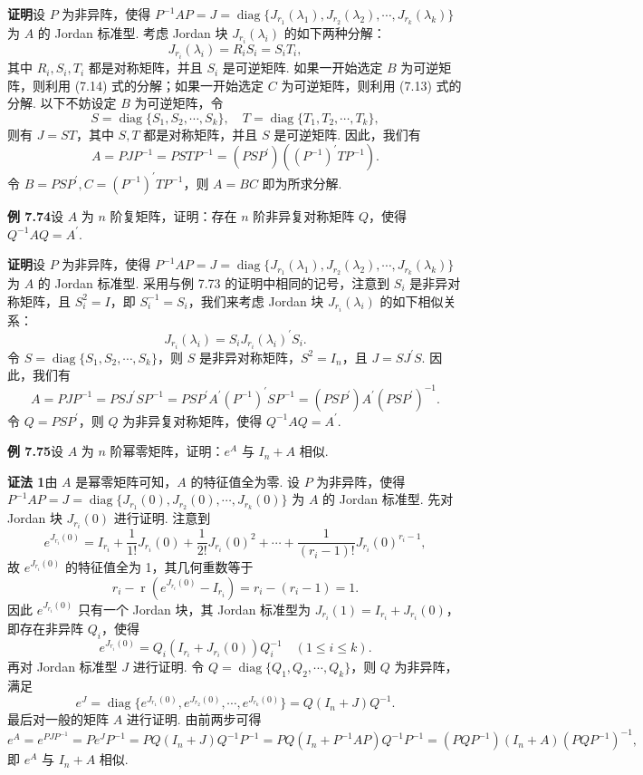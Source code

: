\documentclass[UTF8, 12pt, fontset=fandol, oneside]{ctexart}
\begin{document}
\noindent\textbf{证明}\quad 设 $P$ 为非异阵，使得 $P^{-1}AP=J=\operatorname{diag}\{J_{r_1}(\lambda_1),J_{r_2}(\lambda_2),\cdots,J_{r_k}(\lambda_k)\}$ 为 $A$ 的 Jordan 标准型. 考虑 Jordan 块 $J_{r_i}(\lambda_i)$ 的如下两种分解：
\[
J_{r_i}(\lambda_i)=R_iS_i=S_iT_i,
\tag{7.13--7.14}
\]
其中 $R_i,S_i,T_i$ 都是对称矩阵，并且 $S_i$ 是可逆矩阵. 如果一开始选定 $B$ 为可逆矩阵，则利用 (7.14) 式的分解；如果一开始选定 $C$ 为可逆矩阵，则利用 (7.13) 式的分解. 以下不妨设定 $B$ 为可逆矩阵，令
\[
S=\operatorname{diag}\{S_1,S_2,\cdots,S_k\},\quad T=\operatorname{diag}\{T_1,T_2,\cdots,T_k\},
\]
则有 $J=ST$，其中 $S,T$ 都是对称矩阵，并且 $S$ 是可逆矩阵. 因此，我们有
\[
A=PJP^{-1}=PSTP^{-1}=(PSP^{\prime})((P^{-1})^{\prime}TP^{-1}).
\]
令 $B=PSP^{\prime},C=(P^{-1})^{\prime}TP^{-1}$，则 $A=BC$ 即为所求分解.

\noindent\textbf{例 7.74}\quad 设 $A$ 为 $n$ 阶复矩阵，证明：存在 $n$ 阶非异复对称矩阵 $Q$，使得 $Q^{-1}AQ=A^{\prime}$.

\noindent\textbf{证明}\quad 设 $P$ 为非异阵，使得 $P^{-1}AP=J=\operatorname{diag}\{J_{r_1}(\lambda_1),J_{r_2}(\lambda_2),\cdots,J_{r_k}(\lambda_k)\}$ 为 $A$ 的 Jordan 标准型. 采用与例 7.73 的证明中相同的记号，注意到 $S_i$ 是非异对称矩阵，且 $S_i^2=I$，即 $S_i^{-1}=S_i$，我们来考虑 Jordan 块 $J_{r_i}(\lambda_i)$ 的如下相似关系：
\[
J_{r_i}(\lambda_i)=S_iJ_{r_i}(\lambda_i)^{\prime}S_i.
\]
令 $S=\operatorname{diag}\{S_1,S_2,\cdots,S_k\}$，则 $S$ 是非异对称矩阵，$S^2=I_n$，且 $J=SJ^{\prime}S$. 因此，我们有
\[
A=PJP^{-1}=PSJ^{\prime}SP^{-1}=PSP^{\prime}A^{\prime}(P^{-1})^{\prime}SP^{-1}=(PSP^{\prime})A^{\prime}(PSP^{\prime})^{-1}.
\]
令 $Q=PSP^{\prime}$，则 $Q$ 为非异复对称矩阵，使得 $Q^{-1}AQ=A^{\prime}$.

\noindent\textbf{例 7.75}\quad 设 $A$ 为 $n$ 阶幂零矩阵，证明：$e^A$ 与 $I_n+A$ 相似.

\noindent\textbf{证法 1}\quad 由 $A$ 是幂零矩阵可知，$A$ 的特征值全为零. 设 $P$ 为非异阵，使得 $P^{-1}AP=J=\operatorname{diag}\{J_{r_1}(0),J_{r_2}(0),\cdots,J_{r_k}(0)\}$ 为 $A$ 的 Jordan 标准型. 先对 Jordan 块 $J_{r_i}(0)$ 进行证明. 注意到
\[
e^{J_{r_i}(0)}=I_{r_i}+\frac1{1!}J_{r_i}(0)+\frac1{2!}J_{r_i}(0)^2+\cdots+\frac1{(r_i-1)!}J_{r_i}(0)^{r_i-1},
\]
故 $e^{J_{r_i}(0)}$ 的特征值全为 1，其几何重数等于
\[
r_i-\operatorname{r}(e^{J_{r_i}(0)}-I_{r_i})=r_i-(r_i-1)=1.
\]
因此 $e^{J_{r_i}(0)}$ 只有一个 Jordan 块，其 Jordan 标准型为 $J_{r_i}(1)=I_{r_i}+J_{r_i}(0)$，即存在非异阵 $Q_i$，使得
\[
e^{J_{r_i}(0)}=Q_i(I_{r_i}+J_{r_i}(0))Q_i^{-1}\quad (1\le i\le k).
\]
再对 Jordan 标准型 $J$ 进行证明. 令 $Q=\operatorname{diag}\{Q_1,Q_2,\cdots,Q_k\}$，则 $Q$ 为非异阵，满足
\[
e^J=\operatorname{diag}\{e^{J_{r_1}(0)},e^{J_{r_2}(0)},\cdots,e^{J_{r_k}(0)}\}=Q(I_n+J)Q^{-1}.
\]
最后对一般的矩阵 $A$ 进行证明. 由前两步可得
\[
e^A=e^{PJP^{-1}}=Pe^JP^{-1}=PQ(I_n+J)Q^{-1}P^{-1}
=PQ(I_n+P^{-1}AP)Q^{-1}P^{-1}=(PQP^{-1})(I_n+A)(PQP^{-1})^{-1},
\]
即 $e^A$ 与 $I_n+A$ 相似.
\end{document}
